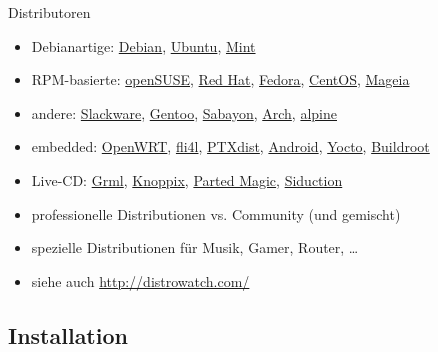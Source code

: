 \documentclass{beamer}
\begin{document}
\begin{frame}{Distributoren}
    \begin{itemize}
        \item Debianartige:
            \href{https://www.debian.org/}{Debian},
            \href{https://www.ubuntu.com/}{Ubuntu},
            \href{https://linuxmint.com/}{Mint}
        \pause
        \item RPM-basierte:
            \href{https://www.opensuse.org/}{openSUSE},
            \href{https://www.redhat.com/}{Red Hat},
            \href{https://getfedora.org/}{Fedora},
            \href{https://www.centos.org/}{CentOS},
            \href{https://www.mageia.org/de/}{Mageia}
        \pause
        \item andere:
            \href{http://www.slackware.com/}{Slackware},
            \href{https://www.gentoo.org/}{Gentoo},
            \href{https://www.sabayon.org/}{Sabayon},
            \href{https://www.archlinux.org/}{Arch},
            \href{https://www.alpinelinux.org/}{alpine}
        \pause
        \item embedded:
            \href{https://openwrt.org/}{OpenWRT},
            \href{http://www.fli4l.de/}{fli4l},
            \href{https://www.ptxdist.org/}{PTXdist},
            \href{https://www.android.com/}{Android},
            \href{https://www.yoctoproject.org/}{Yocto},
            \href{https://buildroot.org/}{Buildroot}
        \pause
        \item Live-CD:
            \href{https://grml.org/}{Grml},
            \href{http://www.knopper.net/knoppix/}{Knoppix},
            \href{https://partedmagic.com/}{Parted Magic},
            \href{http://siduction.org/}{Siduction}
        \pause
        \item professionelle Distributionen vs. Community (und gemischt)
        \item spezielle Distributionen für Musik, Gamer, Router, …
        \item siehe auch \url{http://distrowatch.com/}
    \end{itemize}
\end{frame}

\subsection{Installation}
\end{document}
